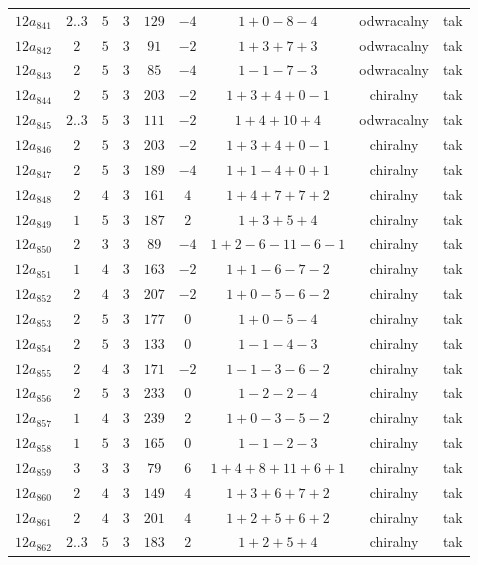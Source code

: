 \begin{longtable}{ccccccccc}
$12a_{841}$ & $2..3$ & $5$ & $3$ & $129$ & $-4$ & $1+0-8-4$ & odwracalny & tak \\
$12a_{842}$ & $2$ & $5$ & $3$ & $91$ & $-2$ & $1+3+7+3$ & odwracalny & tak \\
$12a_{843}$ & $2$ & $5$ & $3$ & $85$ & $-4$ & $1-1-7-3$ & odwracalny & tak \\
$12a_{844}$ & $2$ & $5$ & $3$ & $203$ & $-2$ & $1+3+4+0-1$ & chiralny & tak \\
$12a_{845}$ & $2..3$ & $5$ & $3$ & $111$ & $-2$ & $1+4+10+4$ & odwracalny & tak \\
$12a_{846}$ & $2$ & $5$ & $3$ & $203$ & $-2$ & $1+3+4+0-1$ & chiralny & tak \\
$12a_{847}$ & $2$ & $5$ & $3$ & $189$ & $-4$ & $1+1-4+0+1$ & chiralny & tak \\
$12a_{848}$ & $2$ & $4$ & $3$ & $161$ & $4$ & $1+4+7+7+2$ & chiralny & tak \\
$12a_{849}$ & $1$ & $5$ & $3$ & $187$ & $2$ & $1+3+5+4$ & chiralny & tak \\
$12a_{850}$ & $2$ & $3$ & $3$ & $89$ & $-4$ & $1+2-6-11-6-1$ & chiralny & tak \\
$12a_{851}$ & $1$ & $4$ & $3$ & $163$ & $-2$ & $1+1-6-7-2$ & chiralny & tak \\
$12a_{852}$ & $2$ & $4$ & $3$ & $207$ & $-2$ & $1+0-5-6-2$ & chiralny & tak \\
$12a_{853}$ & $2$ & $5$ & $3$ & $177$ & $0$ & $1+0-5-4$ & chiralny & tak \\
$12a_{854}$ & $2$ & $5$ & $3$ & $133$ & $0$ & $1-1-4-3$ & chiralny & tak \\
$12a_{855}$ & $2$ & $4$ & $3$ & $171$ & $-2$ & $1-1-3-6-2$ & chiralny & tak \\
$12a_{856}$ & $2$ & $5$ & $3$ & $233$ & $0$ & $1-2-2-4$ & chiralny & tak \\
$12a_{857}$ & $1$ & $4$ & $3$ & $239$ & $2$ & $1+0-3-5-2$ & chiralny & tak \\
$12a_{858}$ & $1$ & $5$ & $3$ & $165$ & $0$ & $1-1-2-3$ & chiralny & tak \\
$12a_{859}$ & $3$ & $3$ & $3$ & $79$ & $6$ & $1+4+8+11+6+1$ & chiralny & tak \\
$12a_{860}$ & $2$ & $4$ & $3$ & $149$ & $4$ & $1+3+6+7+2$ & chiralny & tak \\
$12a_{861}$ & $2$ & $4$ & $3$ & $201$ & $4$ & $1+2+5+6+2$ & chiralny & tak \\
$12a_{862}$ & $2..3$ & $5$ & $3$ & $183$ & $2$ & $1+2+5+4$ & chiralny & tak \\

\end{longtable}
